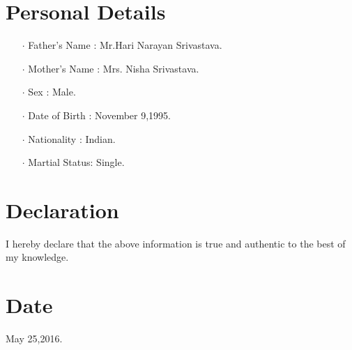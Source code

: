 \documentclass[12pt]{article}
\begin{document}
\section*{Personal Details}
\begin{itemize}
\item[$\cdot$]Father's Name : Mr.Hari Narayan Srivastava.
\item[$\cdot$]Mother's Name : Mrs. Nisha Srivastava.
\item[$\cdot$]Sex           : Male.
\item[$\cdot$]Date of Birth : November 9,1995.
\item[$\cdot$]Nationality   : Indian.
\item[$\cdot$]Martial Status: Single.
\end{itemize}
\section*{Declaration} I hereby declare that the above information is true and authentic to the best of my knowledge.
\section*{Date} May 25,2016.
\end{document}
